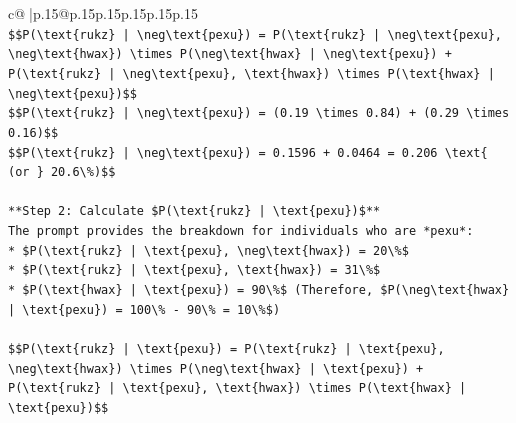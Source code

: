 \documentclass{article}
\begin{document}
{\begin{supertabular}{c@{$\;$}|p{.15\linewidth}@{}p{.15\linewidth}p{.15\linewidth}p{.15\linewidth}p{.15\linewidth}p{.15\linewidth}}
{{{\\ 
\texttt{\$\$P(\textbackslash{}text\{rukz\} | \textbackslash{}neg\textbackslash{}text\{pexu\}) = P(\textbackslash{}text\{rukz\} | \textbackslash{}neg\textbackslash{}text\{pexu\}, \textbackslash{}neg\textbackslash{}text\{hwax\}) \textbackslash{}times P(\textbackslash{}neg\textbackslash{}text\{hwax\} | \textbackslash{}neg\textbackslash{}text\{pexu\}) + P(\textbackslash{}text\{rukz\} | \textbackslash{}neg\textbackslash{}text\{pexu\}, \textbackslash{}text\{hwax\}) \textbackslash{}times P(\textbackslash{}text\{hwax\} | \textbackslash{}neg\textbackslash{}text\{pexu\})\$\$} \\
\texttt{\$\$P(\textbackslash{}text\{rukz\} | \textbackslash{}neg\textbackslash{}text\{pexu\}) = (0.19 \textbackslash{}times 0.84) + (0.29 \textbackslash{}times 0.16)\$\$} \\
\texttt{\$\$P(\textbackslash{}text\{rukz\} | \textbackslash{}neg\textbackslash{}text\{pexu\}) = 0.1596 + 0.0464 = 0.206 \textbackslash{}text\{ (or \} 20.6\textbackslash{}\%)\$\$} \\
\\ 
\texttt{**Step 2: Calculate \$P(\textbackslash{}text\{rukz\} | \textbackslash{}text\{pexu\})\$**} \\
\texttt{The prompt provides the breakdown for individuals who are *pexu*:} \\
\texttt{*   \$P(\textbackslash{}text\{rukz\} | \textbackslash{}text\{pexu\}, \textbackslash{}neg\textbackslash{}text\{hwax\}) = 20\textbackslash{}\%\$} \\
\texttt{*   \$P(\textbackslash{}text\{rukz\} | \textbackslash{}text\{pexu\}, \textbackslash{}text\{hwax\}) = 31\textbackslash{}\%\$} \\
\texttt{*   \$P(\textbackslash{}text\{hwax\} | \textbackslash{}text\{pexu\}) = 90\textbackslash{}\%\$ (Therefore, \$P(\textbackslash{}neg\textbackslash{}text\{hwax\} | \textbackslash{}text\{pexu\}) = 100\textbackslash{}\% {-} 90\textbackslash{}\% = 10\textbackslash{}\%\$)} \\
\\ 
\texttt{\$\$P(\textbackslash{}text\{rukz\} | \textbackslash{}text\{pexu\}) = P(\textbackslash{}text\{rukz\} | \textbackslash{}text\{pexu\}, \textbackslash{}neg\textbackslash{}text\{hwax\}) \textbackslash{}times P(\textbackslash{}neg\textbackslash{}text\{hwax\} | \textbackslash{}text\{pexu\}) + P(\textbackslash{}text\{rukz\} | \textbackslash{}text\{pexu\}, \textbackslash{}text\{hwax\}) \textbackslash{}times P(\textbackslash{}text\{hwax\} | \textbackslash{}text\{pexu\})\$\$} \\
}}}
\end{supertabular}}
\end{document}
